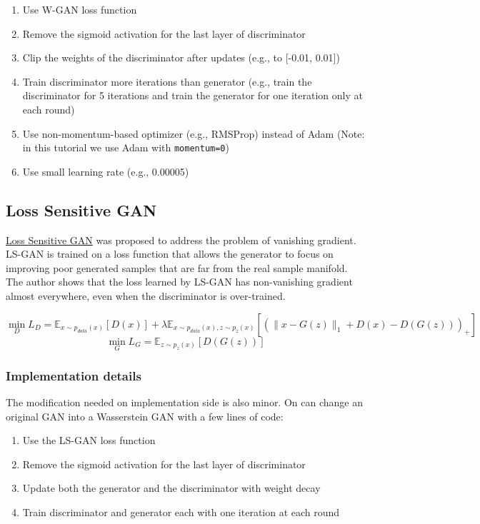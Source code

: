 \documentclass[]{book}
\providecommand{\tightlist}{%
  \setlength{\itemsep}{0pt}\setlength{\parskip}{0pt}}
\theoremstyle{definition}
\theoremstyle{definition}
\theoremstyle{definition}
\theoremstyle{remark}
\begin{document}
\begin{enumerate}
\def\labelenumi{\arabic{enumi}.}
\tightlist
\item
  Use W-GAN loss function
\item
  Remove the sigmoid activation for the last layer of discriminator
\item
  Clip the weights of the discriminator after updates (e.g., to
  {[}-0.01, 0.01{]})
\item
  Train discriminator more iterations than generator (e.g., train the
  discriminator for 5 iterations and train the generator for one
  iteration only at each round)
\item
  Use non-momentum-based optimizer (e.g., RMSProp) instead of Adam
  (Note: in this tutorial we use Adam with \texttt{momentum=0})
\item
  Use small learning rate (e.g., 0.00005)
\end{enumerate}

\subsection{Loss Sensitive GAN}\label{loss-sensitive-gan}

\href{https://arxiv.org/pdf/1701.06264.pdf}{Loss Sensitive GAN} was
proposed to address the problem of vanishing gradient. LS-GAN is trained
on a loss function that allows the generator to focus on improving poor
generated samples that are far from the real sample manifold. The author
shows that the loss learned by LS-GAN has non-vanishing gradient almost
everywhere, even when the discriminator is over-trained.

\[\min_D L_D = \mathbb{E}_{x\sim p_{data}(x)}[D(x)] + \lambda\mathbb{E}_{x\sim p_{data}(x), z\sim p_z(x)}\left[\left(\|x-G(z)\|_1 + D(x) - D(G(z))\right)_+\right]\]
\[\min_G L_G = \mathbb{E}_{z\sim p_z(x)}[D(G(z))]\]

\subsubsection{Implementation details}\label{implementation-details-1}

The modification needed on implementation side is also minor. On can
change an original GAN into a Wasserstein GAN with a few lines of code:

\begin{enumerate}
\def\labelenumi{\arabic{enumi}.}
\tightlist
\item
  Use the LS-GAN loss function
\item
  Remove the sigmoid activation for the last layer of discriminator
\item
  Update both the generator and the discriminator with weight decay
\item
  Train discriminator and generator each with one iteration at each
  round
\end{enumerate}
\end{document}
